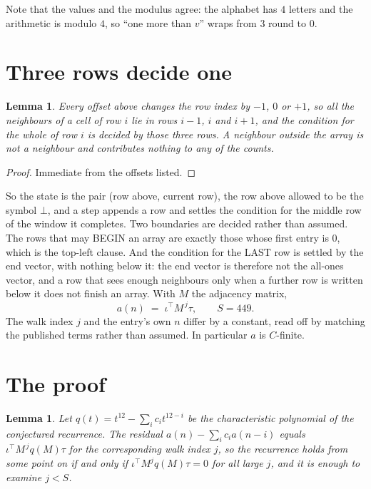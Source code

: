 \documentclass[11pt,a4paper]{article}
\theoremstyle{plain}
\newtheorem{lemma}[theorem]{Lemma}
\theoremstyle{definition}
\begin{document}
Note that the values and the modulus agree: the alphabet has $4$ letters and the arithmetic
is modulo $4$, so ``one more than $v$'' wraps from $3$ round to $0$.

\section{Three rows decide one}

\begin{lemma}\label{lem:win}
Every offset above changes the row index by $-1$, $0$ or $+1$, so all the neighbours of a cell
of row $i$ lie in rows $i-1$, $i$ and $i+1$, and the condition for the whole of row $i$ is
decided by those three rows. A neighbour outside the array is not a neighbour and contributes
nothing to any of the counts.
\end{lemma}

\begin{proof}
Immediate from the offsets listed.
\end{proof}

So the state is the pair (row above, current row), the row above allowed to be the symbol
$\bot$, and a step appends a row and settles the condition for the middle row of the window it
completes. Two boundaries are decided rather than assumed. The rows that may BEGIN an array are
exactly those whose first entry is $0$, which is the top-left clause. And the condition for the
LAST row is settled by the end vector, with nothing below it: the end vector is therefore not
the all-ones vector, and a row that sees enough neighbours only when a further row is written
below it does not finish an array. With $M$ the adjacency matrix,
\[
a(n)\;=\;\iota^{\!\top}M^{\,j}\tau ,\qquad S=449.
\]
The walk index $j$ and the entry's own $n$ differ by a constant, read off by matching the
published terms rather than assumed. In particular $a$ is $C$-finite.

\section{The proof}

\begin{lemma}\label{lem:crit}
Let $q(t)=t^{12}-\sum_i c_it^{12-i}$ be the characteristic polynomial of the
conjectured recurrence. The residual $a(n)-\sum_ic_ia(n-i)$ equals
$\iota^{\!\top}M^{\,j}q(M)\tau$ for the corresponding walk index $j$, so the recurrence
holds from some point on if and only if $\iota^{\!\top}M^{j}q(M)\tau=0$ for all large $j$,
and it is enough to examine $j<S$.
\end{lemma}
\end{document}
